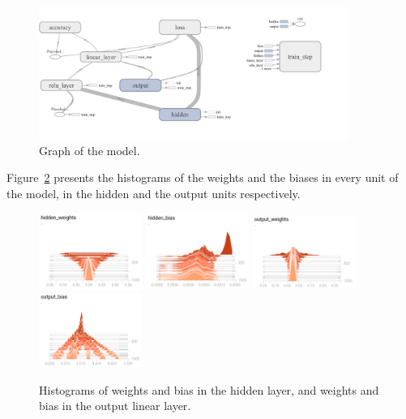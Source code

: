 \documentclass{article}
\begin{document}
\begin{figure}
\centering
\includegraphics[width=0.9\textwidth]{graph.png}
\caption{Graph of the model.}
\label{fig:graph}
\end{figure}

Figure~\ref{fig:histogramsunits} presents the histograms of the weights and the biases in every unit of the model, in the hidden and the output units respectively.

\begin{figure}
\centering
\includegraphics[width=0.3\textwidth]{hidden_weights.png}
\includegraphics[width=0.3\textwidth]{hidden_bias.png}
\includegraphics[width=0.3\textwidth]{output_weights.png}
\includegraphics[width=0.3\textwidth]{output_bias.png}
\caption{Histograms of weights and bias in the hidden layer, and weights and bias in the output linear layer.}
\label{fig:histogramsunits}
\end{figure}
\end{document}
